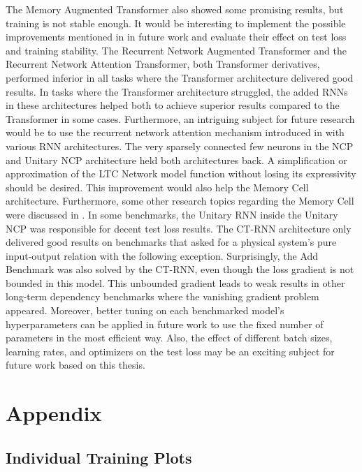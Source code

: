 \documentclass[draft,final]{vutinfth} %
\begin{document}
    The Memory Augmented Transformer also showed some promising results, but training is not stable enough.
    It would be interesting to implement the possible improvements mentioned in  in future work and evaluate their effect on test loss and training stability.
    The Recurrent Network Augmented Transformer and the Recurrent Network Attention Transformer, both Transformer derivatives, performed inferior in all tasks where the Transformer architecture delivered good results.
    In tasks where the Transformer architecture struggled, the added RNNs in these architectures helped both to achieve superior results compared to the Transformer in some cases.
    Furthermore, an intriguing subject for future research would be to use the recurrent network attention mechanism introduced in  with various RNN architectures.
    The very sparsely connected few neurons in the NCP and Unitary NCP architecture held both architectures back.
    A simplification or approximation of the LTC Network model function without losing its expressivity should be desired.
    This improvement would also help the Memory Cell architecture.
    Furthermore, some other research topics regarding the Memory Cell were discussed in .
    In some benchmarks, the Unitary RNN inside the Unitary NCP was responsible for decent test loss results.
    The CT-RNN architecture only delivered good results on benchmarks that asked for a physical system's pure input-output relation with the following exception.
    Surprisingly, the Add Benchmark was also solved by the CT-RNN, even though the loss gradient is not bounded in this model.
    This unbounded gradient leads to weak results in other long-term dependency benchmarks where the vanishing gradient problem appeared.
    Moreover, better tuning on each benchmarked model's hyperparameters can be applied in future work to use the fixed number of parameters in the most efficient way.
    Also, the effect of different batch sizes, learning rates, and optimizers on the test loss may be an exciting subject for future work based on this thesis.


    \chapter{Appendix}


    \section{Individual Training Plots}
\end{document}
